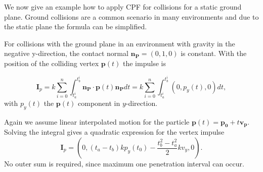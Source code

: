 We now give an example how to apply CPF for collisions for a static ground plane.
Ground collisions are a common scenario in many environments and due to the static plane the formula can be simplified.

 For collisions with the ground plane in an environment with gravity in the negative y-direction, the contact normal $\mathbf{n_P}=(0,1,0)$ is constant. With the position of the colliding vertex $\mathbf p(t)$ the impulse is

\begin{equation}
     \mathbf I_p =k \sum\limits_{i=0}^{n}\int_{t_a^i}^{t_b^i} \mathbf{n_P} \cdot   \mathbf p(t) \mathbf {n_P}dt=k \sum\limits_{i=0}^{n}\int_{t_a^i}^{t_b^i} (0,p_y(t),0)  dt,
\end{equation}
with $p_y(t)$ the $\mathbf p(t)$ component in $y$-direction.

Again we assume linear interpolated motion for the particle $\mathbf p(t)= \mathbf{p_0}+t \mathbf{v_p}$. Solving the integral gives a quadratic expression for the vertex impulse
\begin{equation}
 \mathbf I_p=(0,(t_a-t_b) kp_y(t_0)-\frac{t_b^2-t_a^2}{2} kv_y,0).
\end{equation}
No outer sum is required, since maximum one penetration interval can occur.

